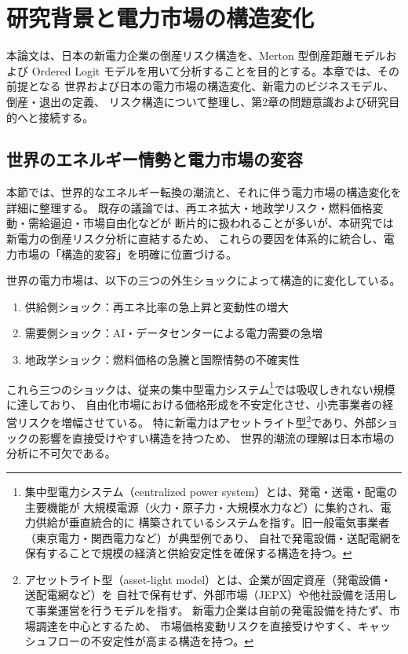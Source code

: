 \chapter{研究背景と電力市場の構造変化}

本論文は、日本の新電力企業の倒産リスク構造を、Merton 型倒産距離モデルおよび
Ordered Logit モデルを用いて分析することを目的とする。本章では、その前提となる
世界および日本の電力市場の構造変化、新電力のビジネスモデル、倒産・退出の定義、
リスク構造について整理し、第2章の問題意識および研究目的へと接続する。


\section{世界のエネルギー情勢と電力市場の変容}

本節では、世界的なエネルギー転換の潮流と、それに伴う電力市場の構造変化を詳細に整理する。
既存の議論では、再エネ拡大・地政学リスク・燃料価格変動・需給逼迫・市場自由化などが
断片的に扱われることが多いが、本研究では新電力の倒産リスク分析に直結するため、
これらの要因を体系的に統合し、電力市場の「構造的変容」を明確に位置づける。

世界の電力市場は、以下の三つの外生ショックによって構造的に変化している。

\begin{enumerate}
  \item 供給側ショック：再エネ比率の急上昇と変動性の増大  
  \item 需要側ショック：AI・データセンターによる電力需要の急増  
  \item 地政学ショック：燃料価格の急騰と国際情勢の不確実性  
\end{enumerate}

これら三つのショックは、従来の集中型電力システム\footnote{
集中型電力システム（centralized power system）とは、発電・送電・配電の主要機能が
大規模電源（火力・原子力・大規模水力など）に集約され、電力供給が垂直統合的に
構築されているシステムを指す。旧一般電気事業者（東京電力・関西電力など）が典型例であり、
自社で発電設備・送配電網を保有することで規模の経済と供給安定性を確保する構造を持つ。
}では吸収しきれない規模に達しており、
自由化市場における価格形成を不安定化させ、小売事業者の経営リスクを増幅させている。
特に新電力はアセットライト型\footnote{
アセットライト型（asset-light model）とは、企業が固定資産（発電設備・送配電網など）を
自社で保有せず、外部市場（JEPX）や他社設備を活用して事業運営を行うモデルを指す。
新電力企業は自前の発電設備を持たず、市場調達を中心とするため、
市場価格変動リスクを直接受けやすく、キャッシュフローの不安定性が高まる構造を持つ。
}であり、外部ショックの影響を直接受けやすい構造を持つため、
世界的潮流の理解は日本市場の分析に不可欠である。

